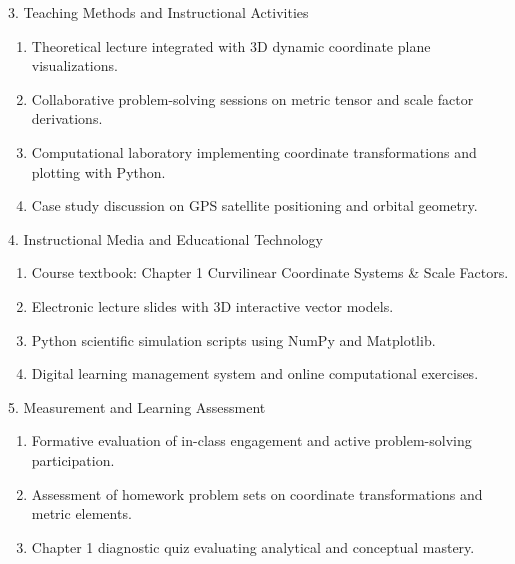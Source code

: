 \newpage

\begin{planbox}[colframe=rbruNavy!85!black, colbacktitle=rbruNavy!85!black]{3. Teaching Methods and Instructional Activities}
\begin{enumerate}[topsep=2pt, itemsep=1pt, partopsep=0pt, parsep=0pt, leftmargin=1.5em]
    \item Theoretical lecture integrated with 3D dynamic coordinate plane visualizations.
    \item Collaborative problem-solving sessions on metric tensor and scale factor derivations.
    \item Computational laboratory implementing coordinate transformations and plotting with Python.
    \item Case study discussion on GPS satellite positioning and orbital geometry.
\end{enumerate}
\end{planbox}

\begin{planbox}[colframe=rbruGold!90!black, colbacktitle=rbruGold!90!black]{4. Instructional Media and Educational Technology}
\begin{enumerate}[topsep=2pt, itemsep=1pt, partopsep=0pt, parsep=0pt, leftmargin=1.5em]
    \item Course textbook: Chapter 1 Curvilinear Coordinate Systems \& Scale Factors.
    \item Electronic lecture slides with 3D interactive vector models.
    \item Python scientific simulation scripts using NumPy and Matplotlib.
    \item Digital learning management system and online computational exercises.
\end{enumerate}
\end{planbox}

\begin{planbox}[colframe=rbruSlate, colbacktitle=rbruSlate]{5. Measurement and Learning Assessment}
\begin{enumerate}[topsep=2pt, itemsep=1pt, partopsep=0pt, parsep=0pt, leftmargin=1.5em]
    \item Formative evaluation of in-class engagement and active problem-solving participation.
    \item Assessment of homework problem sets on coordinate transformations and metric elements.
    \item Chapter 1 diagnostic quiz evaluating analytical and conceptual mastery.
\end{enumerate}
\end{planbox}
\clearpage

